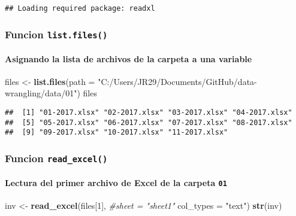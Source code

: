 \documentclass[]{article}
\newenvironment{Shaded}{\begin{snugshade}}{\end{snugshade}}
\newcommand{\KeywordTok}[1]{\textcolor[rgb]{0.13,0.29,0.53}{\textbf{#1}}}
\newcommand{\DataTypeTok}[1]{\textcolor[rgb]{0.13,0.29,0.53}{#1}}
\newcommand{\DecValTok}[1]{\textcolor[rgb]{0.00,0.00,0.81}{#1}}
\newcommand{\StringTok}[1]{\textcolor[rgb]{0.31,0.60,0.02}{#1}}
\newcommand{\CommentTok}[1]{\textcolor[rgb]{0.56,0.35,0.01}{\textit{#1}}}
\newcommand{\NormalTok}[1]{#1}
\let\oldparagraph\paragraph
\renewcommand{\paragraph}[1]{\oldparagraph{#1}\mbox{}}
\begin{document}
\begin{verbatim}
## Loading required package: readxl
\end{verbatim}

\subsubsection{\texorpdfstring{Funcion
\texttt{list.files()}}{Funcion list.files()}}\label{funcion-list.files}

\paragraph{Asignando la lista de archivos de la carpeta a una
variable}\label{asignando-la-lista-de-archivos-de-la-carpeta-a-una-variable}

\begin{Shaded}
\begin{Highlighting}[]
\NormalTok{files <-}\StringTok{ }\KeywordTok{list.files}\NormalTok{(}\DataTypeTok{path =} \StringTok{"C:/Users/JR29/Documents/GitHub/data-wrangling/data/01"}\NormalTok{)}
\NormalTok{files}
\end{Highlighting}
\end{Shaded}

\begin{verbatim}
##  [1] "01-2017.xlsx" "02-2017.xlsx" "03-2017.xlsx" "04-2017.xlsx"
##  [5] "05-2017.xlsx" "06-2017.xlsx" "07-2017.xlsx" "08-2017.xlsx"
##  [9] "09-2017.xlsx" "10-2017.xlsx" "11-2017.xlsx"
\end{verbatim}

\subsubsection{\texorpdfstring{Funcion
\texttt{read\_excel()}}{Funcion read\_excel()}}\label{funcion-read_excel}

\paragraph{\texorpdfstring{Lectura del primer archivo de Excel de la
carpeta
\texttt{01}}{Lectura del primer archivo de Excel de la carpeta 01}}\label{lectura-del-primer-archivo-de-excel-de-la-carpeta-01}

\begin{Shaded}
\begin{Highlighting}[]
\NormalTok{inv <-}\StringTok{ }\KeywordTok{read_excel}\NormalTok{(files[}\DecValTok{1}\NormalTok{], }\CommentTok{#sheet = "sheet1"}
                  \DataTypeTok{col_types =} \StringTok{"text"}\NormalTok{)}
\KeywordTok{str}\NormalTok{(inv)}
\end{Highlighting}
\end{Shaded}
\end{document}

